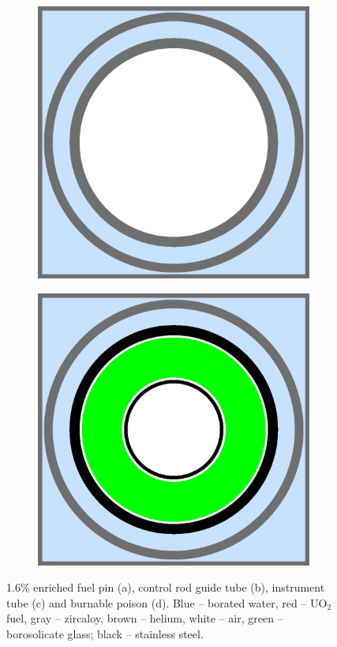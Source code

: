 \begin{figure}[h!]
\begin{subfigure}{.5\textwidth}
  \caption{}
  \label{fig:chap7-pin-3.1}
\end{subfigure}
\begin{subfigure}{.5\textwidth}
  \centering
  \includegraphics[width=0.9\linewidth]{figures/benchmarks/instr-tube}
  \caption{}
  \label{fig:chap7-guide-tube}
\end{subfigure}%
\begin{subfigure}{.5\textwidth}
  \centering
  \includegraphics[width=0.9\linewidth]{figures/benchmarks/burn-abs}
  \caption{}
  \label{fig:chap7-instr-tube}
\end{subfigure}%
\caption[BEAVRS pin cell geometries]{1.6\% enriched fuel pin (a), control rod guide tube (b), instrument tube (c) and burnable poison (d). Blue -- borated water, red -- UO$_2$ fuel, gray -- zircaloy, brown -- helium, white -- air, green -- borosolicate glass; black -- stainless steel.}
\label{fig:chap7-pin-cells}
\end{figure}

